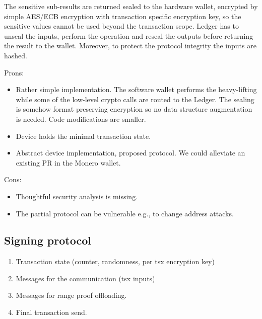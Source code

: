\documentclass[]{article}
\begin{document}
The sensitive sub-results are returned sealed to the hardware wallet, encrypted by simple AES/ECB encryption with transaction specific encryption key, so the sensitive values cannot be used beyond the transaction scope. Ledger has to unseal the inputs, perform the operation and reseal the outputs before returning the result to the wallet. Moreover, to protect the protocol integrity the inputs are hashed. 

\;
\noindent Prons:
\begin{itemize}
	\item Rather simple implementation. The software wallet performs the heavy-lifting while some of the 
	low-level crypto calls are routed to the Ledger. The sealing is somehow format preserving encryption so no data structure augmentation is needed. Code modifications are smaller.
	\item Device holds the minimal transaction state.
	\item Abstract device implementation, proposed protocol. We could alleviate an existing PR\cite{ledger_pr} in the Monero wallet.
\end{itemize}

\noindent Cons:
\begin{itemize}
	\item Thoughtful security analysis is missing. 
	\item The partial protocol can be vulnerable e.g., to change address attacks.
\end{itemize}

\noindent 

\subsection{Signing protocol}

\begin{enumerate}
	\item Transaction state (counter, randomness, per tsx encryption key)
	\item Messages for the communication (tsx inputs)
	\item Messages for range proof offloading.
	\item Final transaction send.	
\end{enumerate}
\end{document}
